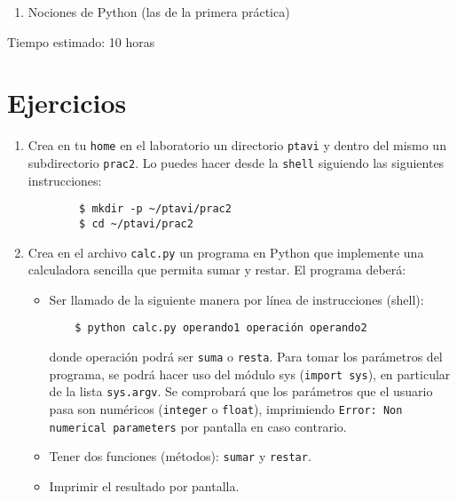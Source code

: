 \documentclass[11pt,a4paper]{article}
\begin{document}
\begin{enumerate}
  \item Nociones de Python (las de la primera práctica)
\end{enumerate}

Tiempo estimado: 10 horas

\section{Ejercicios}

\begin{enumerate}

  \item Crea en tu \texttt{home} en el laboratorio un directorio \texttt{ptavi} y dentro del mismo un subdirectorio \texttt{prac2}. Lo puedes hacer desde la \texttt{shell} siguiendo las siguientes instrucciones:

   \begin{verbatim}
		$ mkdir -p ~/ptavi/prac2
		$ cd ~/ptavi/prac2
   \end{verbatim}


  \item Crea en el archivo \texttt{calc.py} un programa en Python que implemente una calculadora sencilla que permita sumar y restar. El programa deberá:
  \begin{itemize}
    \item Ser llamado de la siguiente manera por línea de instrucciones (shell):
    \begin{verbatim}
    $ python calc.py operando1 operación operando2
    \end{verbatim}
donde operación podrá ser \texttt{suma} o \texttt{resta}. Para tomar los parámetros del programa, se podrá hacer uso del módulo sys (\texttt{import sys}), en particular de la lista \texttt{sys.argv}. Se comprobará que los parámetros que el usuario pasa son numéricos (\texttt{integer} o \texttt{float}), imprimiendo \texttt{Error: Non numerical parameters} por pantalla en caso contrario.
    \item Tener dos funciones (métodos): \texttt{sumar} y \texttt{restar}.
    \item Imprimir el resultado por pantalla.
  \end{itemize}



\end{enumerate}
\end{document}
